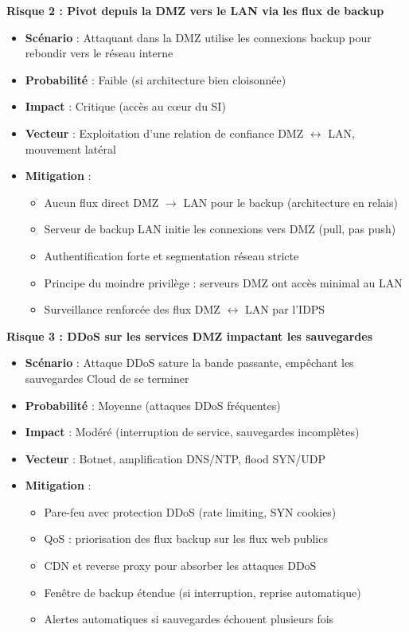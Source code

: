 \medskip

\noindent \textbf{Risque 2 : Pivot depuis la DMZ vers le LAN via les flux de backup}
\begin{itemize}
  \item \textbf{Scénario} : Attaquant dans la DMZ utilise les connexions backup pour rebondir vers le réseau interne
  \item \textbf{Probabilité} : Faible (si architecture bien cloisonnée)
  \item \textbf{Impact} : Critique (accès au cœur du SI)
  \item \textbf{Vecteur} : Exploitation d'une relation de confiance DMZ $\leftrightarrow$ LAN, mouvement latéral
  \item \textbf{Mitigation} :
  \begin{itemize}
    \item Aucun flux direct DMZ $\rightarrow$ LAN pour le backup (architecture en relais)
    \item Serveur de backup LAN initie les connexions vers DMZ (pull, pas push)
    \item Authentification forte et segmentation réseau stricte
    \item Principe du moindre privilège : serveurs DMZ ont accès minimal au LAN
    \item Surveillance renforcée des flux DMZ $\leftrightarrow$ LAN par l'IDPS
  \end{itemize}
\end{itemize}

\medskip

\noindent \textbf{Risque 3 : DDoS sur les services DMZ impactant les sauvegardes}
\begin{itemize}
  \item \textbf{Scénario} : Attaque DDoS sature la bande passante, empêchant les sauvegardes Cloud de se terminer
  \item \textbf{Probabilité} : Moyenne (attaques DDoS fréquentes)
  \item \textbf{Impact} : Modéré (interruption de service, sauvegardes incomplètes)
  \item \textbf{Vecteur} : Botnet, amplification DNS/NTP, flood SYN/UDP
  \item \textbf{Mitigation} :
  \begin{itemize}
    \item Pare-feu avec protection DDoS (rate limiting, SYN cookies)
    \item QoS : priorisation des flux backup sur les flux web publics
    \item CDN et reverse proxy pour absorber les attaques DDoS
    \item Fenêtre de backup étendue (si interruption, reprise automatique)
    \item Alertes automatiques si sauvegardes échouent plusieurs fois
  \end{itemize}
\end{itemize}

